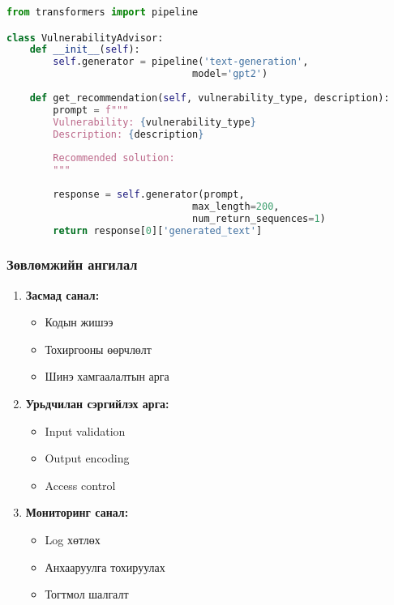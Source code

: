 \documentclass[main.tex]{subfiles}
\begin{document}
\begin{lstlisting}[language=Python, caption=AI Vulnerability Advisor]
from transformers import pipeline

class VulnerabilityAdvisor:
    def __init__(self):
        self.generator = pipeline('text-generation', 
                                model='gpt2')
    
    def get_recommendation(self, vulnerability_type, description):
        prompt = f"""
        Vulnerability: {vulnerability_type}
        Description: {description}
        
        Recommended solution:
        """
        
        response = self.generator(prompt, 
                                max_length=200, 
                                num_return_sequences=1)
        return response[0]['generated_text']
\end{lstlisting}

\subsubsection{Зөвлөмжийн ангилал}
\begin{enumerate}
    \item \textbf{Засмад санал:}
    \begin{itemize}
        \item Кодын жишээ
        \item Тохиргооны өөрчлөлт
        \item Шинэ хамгаалалтын арга
    \end{itemize}
    
    \item \textbf{Урьдчилан сэргийлэх арга:}
    \begin{itemize}
        \item Input validation
        \item Output encoding
        \item Access control
    \end{itemize}
    
    \item \textbf{Мониторинг санал:}
    \begin{itemize}
        \item Log хөтлөх
        \item Анхааруулга тохируулах
        \item Тогтмол шалгалт
    \end{itemize}
\end{enumerate}
\end{document}
